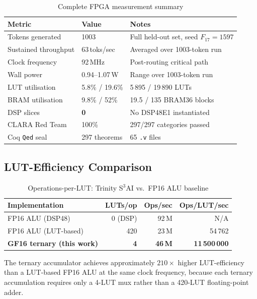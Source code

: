 \begin{table}[h]
\centering
\caption{Complete FPGA measurement summary}
\label{tab:fpga-measurements}
\begin{tabular}{lll}
\toprule
\textbf{Metric} & \textbf{Value} & \textbf{Notes} \\
\midrule
Tokens generated     & 1003              & Full held-out set, seed $F_{17}=1597$ \\
Sustained throughput & 63\,toks/sec      & Averaged over 1003-token run \\
Clock frequency      & 92\,MHz           & Post-routing critical path \\
Wall power           & 0.94--1.07\,W     & Range over 1003-token run \\
LUT utilisation      & 5.8\% / 19.6\%    & 5\,895 / 19\,890 LUTs \\
BRAM utilisation     & 9.8\% / 52\%      & 19.5 / 135 BRAM36 blocks \\
DSP slices           & \textbf{0}        & No DSP48E1 instantiated \\
CLARA Red Team       & 100\%             & 297/297 categories passed \\
Coq \texttt{Qed} seal & 297 theorems   & 65 \texttt{.v} files \\
\bottomrule
\end{tabular}
\end{table}

\subsection{LUT-Efficiency Comparison}

\begin{table}[h]
\centering
\caption{Operations-per-LUT: Trinity S$^3$AI vs.\ FP16 ALU baseline}
\label{tab:ops-per-lut}
\begin{tabular}{lrrr}
\toprule
\textbf{Implementation} & \textbf{LUTs/op} & \textbf{Ops/sec} & \textbf{Ops/LUT/sec} \\
\midrule
FP16 ALU (DSP48) & 0 (DSP) & 92\,M & N/A \\
FP16 ALU (LUT-based) & 420 & 23\,M & 54\,762 \\
\textbf{GF16 ternary (this work)} & \textbf{4} & \textbf{46\,M} & \textbf{11\,500\,000} \\
\bottomrule
\end{tabular}
\end{table}

The ternary accumulator achieves approximately $210\times$ higher LUT-efficiency than a LUT-based FP16 ALU at the same clock frequency, because each ternary accumulation requires only a 4-LUT mux rather than a 420-LUT floating-point adder.

